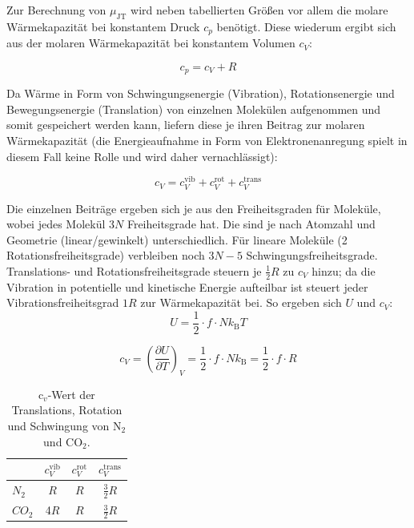 \documentclass[a4paper,12pt,oneside,onecolum,final,openany]{report}
\begin{document}
Zur Berechnung von $\mu_\mathrm{JT}$ wird neben tabellierten Größen vor allem die molare Wärmekapazität bei konstantem Druck $c_p$ benötigt. Diese wiederum ergibt sich aus der molaren Wärmekapazität bei konstantem Volumen $c_V$:

\begin{equation}
c_p = c_V +R \label{cpauscv}
\end{equation}

Da Wärme in Form von Schwingungsenergie (Vibration), Rotationsenergie und Bewegungsenergie (Translation) von einzelnen Molekülen aufgenommen und somit gespeichert werden kann, liefern diese je ihren Beitrag zur molaren Wärmekapazität (die Energieaufnahme in Form von Elektronenanregung spielt in diesem Fall keine Rolle und wird daher vernachlässigt):

\begin{equation}
c_V = c_V^\mathrm{ vib} + c_V^\mathrm{ rot} + c_V^\mathrm{trans}  
\label{cv=rotvibtrans}
\end{equation}

Die einzelnen Beiträge ergeben sich je aus den Freiheitsgraden für Moleküle, wobei jedes Molekül $3N$ Freiheitsgrade hat. Die sind je nach Atomzahl und Geometrie (linear/gewinkelt) unterschiedlich. Für lineare Moleküle (2 Rotationsfreiheitsgrade) verbleiben noch $3N-5$ Schwingungsfreiheitsgrade. \\
Translations- und Rotationsfreiheitsgrade steuern je $\frac{1}{2} R$ zu $c_V$ hinzu; da die Vibration in potentielle und kinetische Energie aufteilbar ist steuert jeder Vibrationsfreiheitsgrad $1R$ zur Wärmekapazität bei. So ergeben sich $U$ und $c_V$:\\

 \begin{equation}
 U= \frac{1}{2} \cdot f \cdot Nk_\mathrm{B}T
 \end{equation}

\begin{equation}
c_V = \left(\frac{\partial U}{\partial T}\right)_V =\frac{1}{2} \cdot f \cdot N k_\mathrm{B} = \frac{1}{2}\cdot f\cdot R
\end{equation}



\begin{table} [h]
\centering
\caption{$\text{c}_v$-Wert der Translations, Rotation und Schwingung von $\text{N}_2$ und $\text{CO}_2$.}
\begin{tabular} {l | c|  c | c}
	 & $c_V^\mathrm{ vib}$  & $c_V^\mathrm{ rot}$ & $c_V^\mathrm{trans}$\\
	 \hline
	 $N_2$ & $R$ & $R$ &$\frac{3}{2}R$\\
	  $CO_2$ & 4$R$ & $R$ &$\frac{3}{2}R$\\
\end{tabular}
\end{table}
\end{document}
